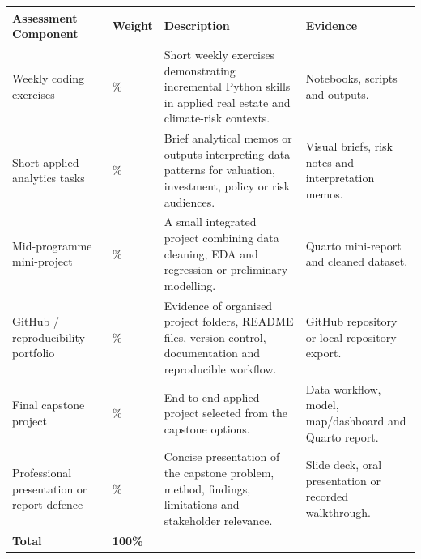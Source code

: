 \documentclass[
  a4paper,
]{article}
\newcounter{none} %
\begin{document}
{\def\LTcaptype{none} %
\begin{longtable}[]{@{}
  >{\raggedright\arraybackslash}p{}
  >{\raggedleft\arraybackslash}p{}
  >{\raggedright\arraybackslash}p{}
  >{\raggedright\arraybackslash}p{}@{}}
\toprule\noalign{}
\begin{minipage}[b]{\linewidth}\raggedright
Assessment Component
\end{minipage} & \begin{minipage}[b]{\linewidth}\raggedleft
Weight
\end{minipage} & \begin{minipage}[b]{\linewidth}\raggedright
Description
\end{minipage} & \begin{minipage}[b]{\linewidth}\raggedright
Evidence
\end{minipage} \\
\midrule\noalign{}
\endhead
\bottomrule\noalign{}
\endlastfoot
Weekly coding exercises & 20\% & Short weekly exercises demonstrating
incremental Python skills in applied real estate and climate-risk
contexts. & Notebooks, scripts and outputs. \\
Short applied analytics tasks & 15\% & Brief analytical memos or outputs
interpreting data patterns for valuation, investment, policy or risk
audiences. & Visual briefs, risk notes and interpretation memos. \\
Mid-programme mini-project & 15\% & A small integrated project combining
data cleaning, EDA and regression or preliminary modelling. & Quarto
mini-report and cleaned dataset. \\
GitHub / reproducibility portfolio & 15\% & Evidence of organised
project folders, README files, version control, documentation and
reproducible workflow. & GitHub repository or local repository
export. \\
Final capstone project & 25\% & End-to-end applied project selected from
the capstone options. & Data workflow, model, map/dashboard and Quarto
report. \\
Professional presentation or report defence & 10\% & Concise
presentation of the capstone problem, method, findings, limitations and
stakeholder relevance. & Slide deck, oral presentation or recorded
walkthrough. \\
\textbf{Total} & \textbf{100\%} & & \\
\end{longtable}
}
\end{document}
